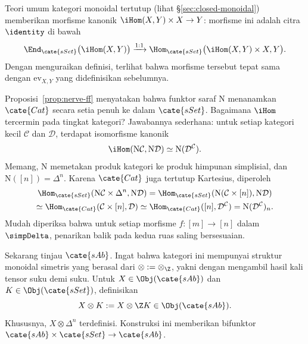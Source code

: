 Teori umum kategori monoidal tertutup (lihat
\S\ref{sec:closed-monoidal}) memberikan morfisme kanonik
$\iHom(X,Y)\times X\to Y$: morfisme ini adalah citra $\identity$ di bawah
\[
\End_{\cate{sSet}}\bigl(\iHom(X,Y)\bigr)\xrightarrow{1:1}
\Hom_{\cate{sSet}}\bigl(\iHom(X,Y)\times X,Y\bigr).
\]
Dengan menguraikan definisi, terlihat bahwa morfisme tersebut tepat sama
dengan $\mathrm{ev}_{X,Y}$ yang didefinisikan sebelumnya.

\begin{example}
	Proposisi~\ref{prop:nerve-ff} menyatakan bahwa funktor saraf $\mathrm{N}$
	menanamkan $\cate{Cat}$ secara setia penuh ke dalam $\cate{sSet}$.
	Bagaimana $\iHom$ tercermin pada tingkat kategori? Jawabannya sederhana:
	untuk setiap kategori kecil $\mathcal{C}$ dan $\mathcal{D}$, terdapat
	isomorfisme kanonik
	\[
	\iHom(\mathrm{N}\mathcal{C},\mathrm{N}\mathcal{D})
	\simeq\mathrm{N}(\mathcal{D}^{\mathcal{C}}).
	\]
	Memang, $\mathrm{N}$ memetakan produk kategori ke produk himpunan
	simplisial, dan $\mathrm{N}([n])=\Delta^n$. Karena $\cate{Cat}$ juga
	tertutup Kartesius, diperoleh
	\begin{multline*}
		\Hom_{\cate{sSet}}(\mathrm{N}\mathcal{C}\times\Delta^n,
		\mathrm{N}\mathcal{D})
		=\Hom_{\cate{sSet}}(\mathrm{N}(\mathcal{C}\times[n]),
		\mathrm{N}\mathcal{D})\\
		\simeq\Hom_{\cate{Cat}}(\mathcal{C}\times[n],\mathcal{D})
		\simeq\Hom_{\cate{Cat}}([n],\mathcal{D}^{\mathcal{C}})
		=\mathrm{N}(\mathcal{D}^{\mathcal{C}})_n.
	\end{multline*}
	Mudah diperiksa bahwa untuk setiap morfisme $f:[m]\to[n]$ dalam
	$\simpDelta$, penarikan balik pada kedua ruas saling bersesuaian.
\end{example}

Sekarang tinjau $\cate{sAb}$. Ingat bahwa kategori ini mempunyai struktur
monoidal simetris yang berasal dari $\otimes:=\otimes_{\Z}$, yakni dengan
mengambil hasil kali tensor suku demi suku. Untuk
$X\in\Obj(\cate{sAb})$ dan $K\in\Obj(\cate{sSet})$, definisikan
\[
X\otimes K:=X\otimes\Z K\in\Obj(\cate{sAb}).
\]
Khususnya, $X\otimes\Delta^n$ terdefinisi. Konstruksi ini memberikan
bifunktor $\cate{sAb}\times\cate{sSet}\to\cate{sAb}$.

